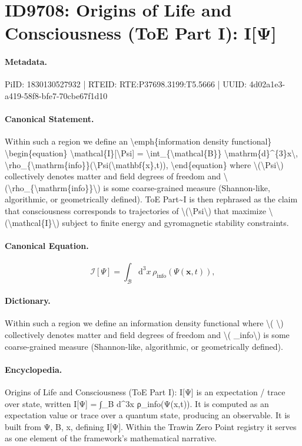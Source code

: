 \section*{ID9708: Origins of Life and Consciousness (ToE Part I): I[Ψ]}
\paragraph{Metadata.}
PiID: 1830130527932 | RTEID: RTE:P37698.3199:T5.5666 | UUID: 4d02a1e3-a419-58f8-bfe7-70cbe67f1d10

\paragraph{Canonical Statement.}
Within such a region we define an \textbackslash{}emph\{information density functional\} \textbackslash{}begin\{equation\} \textbackslash{}mathcal\{I\}[\textbackslash{}Psi] = \textbackslash{}int\_\{\textbackslash{}mathcal\{B\}\} \textbackslash{}mathrm\{d\}\textasciicircum{}\{3\}x\textbackslash{}, \textbackslash{}rho\_\{\textbackslash{}mathrm\{info\}\}(\textbackslash{}Psi(\textbackslash{}mathbf\{x\},t)), \textbackslash{}end\{equation\} where \textbackslash{}(\textbackslash{}Psi\textbackslash{}) collectively denotes matter and field degrees of freedom and \textbackslash{}(\textbackslash{}rho\_\{\textbackslash{}mathrm\{info\}\}\textbackslash{}) is some coarse-grained measure (Shannon-like, algorithmic, or geometrically defined). ToE Part\textasciitilde{}I is then rephrased as the claim that consciousness corresponds to trajectories of \textbackslash{}(\textbackslash{}Psi\textbackslash{}) that maximize \textbackslash{}(\textbackslash{}mathcal\{I\}\textbackslash{}) subject to finite energy and gyromagnetic stability constraints.

\paragraph{Canonical Equation.}
\[
\mathcal{I}[\Psi] = \int_{\mathcal{B}} \mathrm{d}^{3}x\, \rho_{\mathrm{info}}(\Psi(\mathbf{x},t)),
\]

\paragraph{Dictionary.}
Within such a region we define an information density functional where \textbackslash{}( \textbackslash{}) collectively denotes matter and field degrees of freedom and \textbackslash{}( \_info\textbackslash{}) is some coarse-grained measure (Shannon-like, algorithmic, or geometrically defined).

\paragraph{Encyclopedia.}
Origins of Life and Consciousness (ToE Part I): I[Ψ] is an expectation / trace over state, written I[Ψ] = ∫\_B d\textasciicircum{}3x ρ\_info(Ψ(x,t)). It is computed as an expectation value or trace over a quantum state, producing an observable. It is built from Ψ, B, x, defining I[Ψ]. Within the Trawin Zero Point registry it serves as one element of the framework's mathematical narrative.
